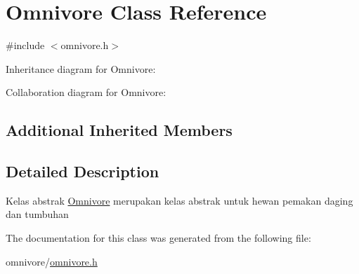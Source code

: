 \hypertarget{classOmnivore}{}\section{Omnivore Class Reference}
\label{classOmnivore}


{\ttfamily \#include $<$omnivore.\+h$>$}



Inheritance diagram for Omnivore\+:


Collaboration diagram for Omnivore\+:
\subsection*{Additional Inherited Members}


\subsection{Detailed Description}
Kelas abstrak \hyperlink{classOmnivore}{Omnivore} merupakan kelas abstrak untuk hewan pemakan daging dan tumbuhan 

The documentation for this class was generated from the following file\+:\begin{DoxyCompactItemize}
\item 
omnivore/\hyperlink{omnivore_8h}{omnivore.\+h}\end{DoxyCompactItemize}
